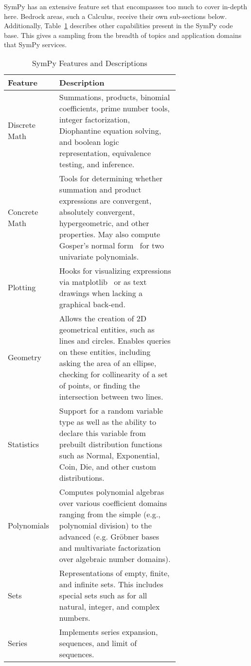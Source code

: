 
SymPy has an extensive feature set that encompasses too much to cover
in-depth here. Bedrock areas, such a Calculus, receive their own sub-sections
below. Additionally, Table~\ref{features-table} describes other capabilities
present in the SymPy code base. This gives a sampling from the breadth of
topics and application domains that SymPy services.


\begin{longtable}[htbc]{|l|p{0.7\linewidth}|}
\caption{SymPy Features and Descriptions\label{features-table}}\\
\hline
\textbf{Feature} & \textbf{Description} \\
\hline
Discrete Math & Summations, products, binomial coefficients,
    prime number tools, integer factorization, Diophantine equation solving, and
    boolean logic representation, equivalence testing, and inference.\\
Concrete Math & Tools for determining whether summation and product
    expressions are convergent, absolutely convergent, hypergeometric, and
    other properties. May also compute Gosper's normal form~\cite{petkovvsek1996bak} for two univariate polynomials.\\
Plotting & Hooks for visualizing expressions via matplotlib~\cite{Hunter:2007}
    or as text drawings when lacking a graphical back-end.\\
Geometry & Allows the creation of 2D geometrical entities,
    such as lines and circles. Enables queries on these entities, including
    asking the area of an ellipse, checking for collinearity of a set of
    points, or finding the intersection between two lines.\\
Statistics & Support for a random variable type as well as the ability to
    declare this variable from prebuilt distribution functions such as
    Normal, Exponential, Coin, Die, and other custom distributions.\\
Polynomials & Computes polynomial algebras over various coefficient domains
    ranging from the simple (e.g., polynomial division) to the advanced
    (e.g. Gr\"obner bases~\cite{adams1994introduction} and multivariate
    factorization over algebraic number domains).\\
Sets & Representations of empty, finite, and infinite sets. This includes
    special sets such as for all natural, integer, and complex numbers.\\
Series & Implements series expansion, sequences, and limit of sequences.

\end{longtable}
